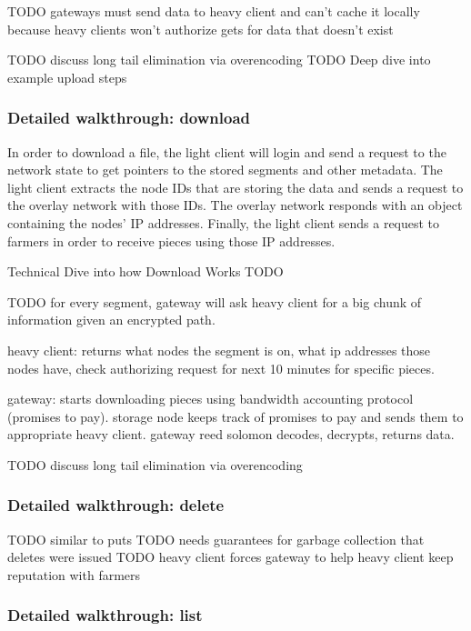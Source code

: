 \documentclass[a4paper,10pt]{article} \usepackage[utf8]{inputenc}
\newcommand{\todo}[1]{{\color{red} TODO #1 }}
\begin{document}
\todo{gateways must send data to heavy client and can't cache it locally because
heavy clients won't authorize gets for data that doesn't exist}

\todo{discuss long tail elimination via overencoding}
\todo{Deep dive into example upload steps}

\subsubsection{Detailed walkthrough: download}

In order to download a file, the light
client will login and send a request to the network state to get pointers to the
stored segments and other metadata. The light client extracts the node IDs that
are storing the data and sends a request to the overlay network with those IDs.
The overlay network responds with an object containing the nodes' IP addresses.
Finally, the light client sends a request to farmers in order to receive pieces
using those IP addresses.

Technical Dive into how Download Works \todo{}

\todo{
  for every segment, gateway will ask heavy client for a big chunk of
  information given an encrypted path.

  heavy client: returns what nodes the segment is on, what ip addresses those
    nodes have, check authorizing request for next 10 minutes for
    specific pieces.

  gateway: starts downloading pieces using bandwidth accounting protocol
    (promises to pay). storage node keeps track of promises to pay and sends
    them to appropriate heavy client.
  gateway reed solomon decodes, decrypts, returns data.

}

\todo{discuss long tail elimination via overencoding}

\subsubsection{Detailed walkthrough: delete}

\todo{similar to puts}
\todo{needs guarantees for garbage collection that deletes were issued}
\todo{heavy client forces gateway to help heavy client keep reputation with
      farmers}

\subsubsection{Detailed walkthrough: list}
\end{document}
